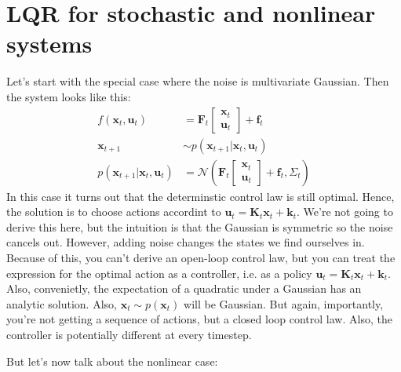 \documentclass{report}
\begin{document}
\section{LQR for stochastic and nonlinear systems}
Let's start with the special case where the noise is multivariate Gaussian.
Then the system looks like this:
\begin{align}
f (\bm{x}_{t}, \bm{u}_{t} ) &= \bm{F}_{t} \begin{bmatrix} \bm{x}_{t} \\ \bm{u}_{t} \end{bmatrix} + \bm{f}_{t} \\
\bm{x}_{t+1} &\sim p (\bm{x}_{t+1}| \bm{x}_{t}, \bm{u}_{t}) \\
p (\bm{x}_{t+1}| \bm{x}_{t}, \bm{u}_{t}) &= 
\mathcal{N} \left( \bm{F}_{t} \begin{bmatrix} \bm{x}_{t} \\ \bm{u}_{t} \end{bmatrix} + \bm{f}_{t}, \Sigma_{ t }  \right) 
\end{align}
In this case it turns out that the determinstic control law is still optimal.
Hence, the solution is to choose actions accordint to $ \bm{u}_{t} = \bm{K}_{t}\bm{x}_{t} + \bm{k}_{t}  $.
We're not going to derive this here, 
but the intuition is that the Gaussian is symmetric so the noise cancels out.
However, adding noise changes the states we find ourselves in.
Because of this, you can't derive an open-loop control law, but you can treat
the expression for the optimal action as a controller, i.e. as a policy $ \bm{u}_{t} = \bm{K}_{t}\bm{x}_{t} + \bm{k}_{t}  $.
Also, convenietly, the expectation of a quadratic under a Gaussian has an analytic solution.
Also, $ \bm{x}_{t} \sim p (\bm{x}_{t})  $ will be Gaussian.
But again, importantly, you're not getting a sequence of actions, but a closed loop control law.
Also, the controller is potentially different at every timestep.

But let's now talk about the nonlinear case:
\end{document}
